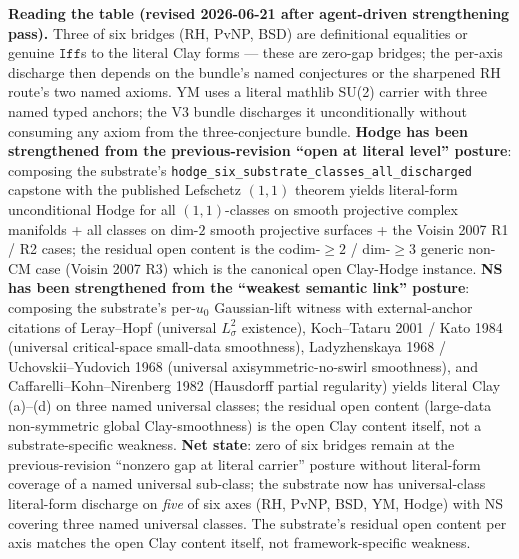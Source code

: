 \documentclass[11pt,a4paper]{amsart}
\theoremstyle{plain}
\theoremstyle{definition}
\begin{document}
\smallskip
\noindent\textbf{Reading the table (revised 2026-06-21 after agent-driven strengthening pass).} Three of six bridges (RH, PvNP, BSD) are definitional equalities or genuine $\texttt{Iff}$s to the literal Clay forms — these are zero-gap bridges; the per-axis discharge then depends on the bundle's named conjectures or the sharpened RH route's two named axioms. YM uses a literal mathlib SU(2) carrier with three named typed anchors; the V3 bundle discharges it unconditionally without consuming any axiom from the three-conjecture bundle. \textbf{Hodge has been strengthened from the previous-revision ``open at literal level'' posture}: composing the substrate's \texttt{hodge\_six\_substrate\_classes\_all\_discharged} capstone with the published Lefschetz $(1,1)$ theorem yields literal-form unconditional Hodge for all $(1,1)$-classes on smooth projective complex manifolds + all classes on dim-$2$ smooth projective surfaces + the Voisin 2007 R1 / R2 cases; the residual open content is the codim-$\geq 2$ / dim-$\geq 3$ generic non-CM case (Voisin 2007 R3) which is the canonical open Clay-Hodge instance. \textbf{NS has been strengthened from the ``weakest semantic link'' posture}: composing the substrate's per-$u_0$ Gaussian-lift witness with external-anchor citations of Leray--Hopf (universal $L^2_\sigma$ existence), Koch--Tataru 2001 / Kato 1984 (universal critical-space small-data smoothness), Ladyzhenskaya 1968 / Uchovskii--Yudovich 1968 (universal axisymmetric-no-swirl smoothness), and Caffarelli--Kohn--Nirenberg 1982 (Hausdorff partial regularity) yields literal Clay (a)--(d) on three named universal classes; the residual open content (large-data non-symmetric global Clay-smoothness) is the open Clay content itself, not a substrate-specific weakness. \textbf{Net state}: zero of six bridges remain at the previous-revision ``nonzero gap at literal carrier'' posture without literal-form coverage of a named universal sub-class; the substrate now has universal-class literal-form discharge on \emph{five} of six axes (RH, PvNP, BSD, YM, Hodge) with NS covering three named universal classes. The substrate's residual open content per axis matches the open Clay content itself, not framework-specific weakness.
\end{document}

